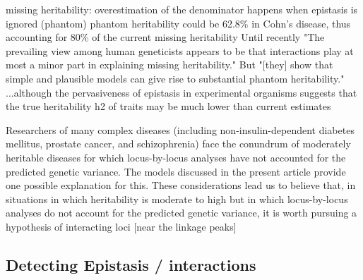 missing heritability: overestimation of the denominator happens when epistasis is ignored (phantom) \cite{zuk2012mystery}
phantom heritability could be 62.8\% in Cohn's disease, thus accounting for 80\% of the current missing heritability \cite{zuk2012mystery}
Until recently "The prevailing view among human geneticists appears to be that interactions play at most a minor  part in explaining missing heritability."	 \cite{zuk2012mystery}
But "[they] show that simple and plausible models can give rise to substantial phantom heritability."	 \cite{zuk2012mystery}
...although the pervasiveness of epistasis in experimental organisms suggests that the true heritability h2 of traits may be much lower than current estimates \cite{zuk2012mystery}

Researchers of many complex diseases (including non-insulin-dependent diabetes mellitus, prostate cancer, and schizophrenia) face the conundrum of moderately heritable diseases for which locus-by-locus analyses have not accounted for the predicted genetic variance. The models discussed in the present article provide one possible explanation for this. \cite{culverhouse2002perspective}
These considerations lead us to believe that, in situations in which heritability is moderate to high but in which locus-by-locus analyses do not account for the predicted genetic variance, it is worth pursuing a hypothesis of interacting loci [near the linkage peaks] \cite{culverhouse2002perspective}

\subsection{Detecting Epistasis / interactions}

